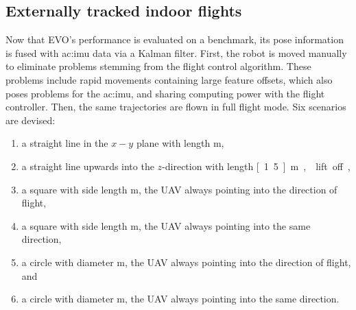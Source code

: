 \subsection{Externally tracked indoor flights}
\label{ssec:perception_results_externallytrackedindoorflights}

Now that EVO's performance is evaluated on a benchmark, its pose information is fused with \gls{ac:imu} data via a Kalman filter.
First, the robot is moved manually to eliminate problems stemming from the flight control algorithm.
These problems include rapid movements containing large feature offsets, which also poses problems for the \gls{ac:imu}, and sharing computing power with the flight controller.
Then, the same trajectories are flown in full flight mode.
Six scenarios are devised:

\begin{enumerate}
  \item a straight line in the $x-y$ plane with length \unit[2]{m},
  \item a straight line upwards into the $z$-direction with length \unit[1.5]{m}, \ie lift off,
  \item a square with side length \unit[2]{m}, the UAV always pointing into the direction of flight,
  \item a square with side length \unit[2]{m}, the UAV always pointing into the same direction,
  \item a circle with diameter \unit[2]{m}, the UAV always pointing into the direction of flight, and
  \item a circle with diameter \unit[2]{m}, the UAV always pointing into the same direction.
\end{enumerate}

